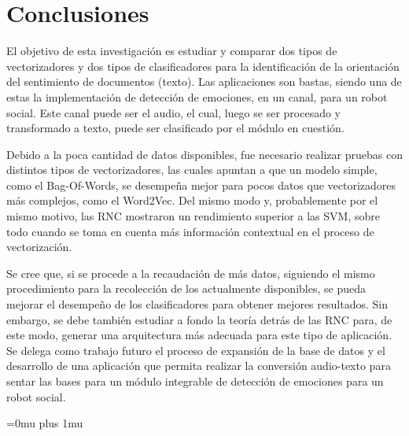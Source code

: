 \documentclass[conference]{IEEEtran}
\begin{document}




\section{Conclusiones} \label{sec:conclusiones}
    
	El objetivo de esta investigación es estudiar y comparar dos tipos de vectorizadores y dos tipos de clasificadores para la identificación de la orientación del sentimiento de documentos (texto). Las aplicaciones son bastas, siendo una de estas la implementación de detección de emociones, en un canal, para un robot social. Este canal puede ser el audio, el cual, luego se ser procesado y transformado a texto, puede ser clasificado por el módulo en cuestión.
    
    Debido a la poca cantidad de datos disponibles, fue necesario realizar pruebas con distintos tipos de vectorizadores, las cuales apuntan a que un modelo simple, como el Bag-Of-Words, se desempeña mejor para pocos datos que vectorizadores más complejos, como el Word2Vec. Del mismo modo y, probablemente por el mismo motivo, las RNC mostraron un rendimiento superior a las SVM, sobre todo cuando se toma en cuenta más información contextual en el proceso de vectorización.
        
    Se cree que, si se procede a la recaudación de más datos, siguiendo el mismo procedimiento para la recolección de los actualmente disponibles, se pueda mejorar el desempeño de los clasificadores para obtener mejores resultados. Sin embargo, se debe también estudiar a fondo la teoría detrás de las RNC para, de este modo, generar una arquitectura más adecuada para este tipo de aplicación. Se delega como trabajo futuro el proceso de expansión de la base de datos y el desarrollo de una aplicación que permita realizar la conversión audio-texto para sentar las bases para un módulo integrable de detección de emociones para un robot social.




\Urlmuskip=0mu plus 1mu\relax

\nocite{*}


\end{document}
